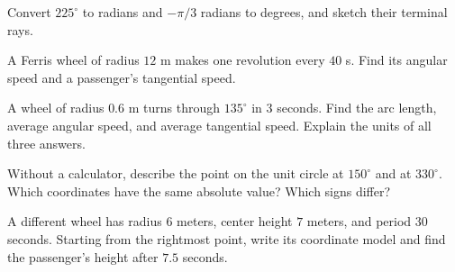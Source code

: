 \begin{practice}Convert $225^\circ$ to radians and $-\pi/3$ radians to degrees, and sketch their terminal rays.\end{practice}

\begin{practice}A Ferris wheel of radius $12$ m makes one revolution every $40$ s. Find its angular speed and a passenger's tangential speed.\end{practice}

\begin{practice}
A wheel of radius $0.6$ m turns through $135^\circ$ in $3$ seconds.
Find the arc length, average angular speed, and average tangential speed.
Explain the units of all three answers.
\end{practice}

\begin{practice}
Without a calculator, describe the point on the unit circle at
$150^\circ$ and at $330^\circ$. Which coordinates have the same
absolute value? Which signs differ?
\end{practice}

\begin{practice}
A different wheel has radius $6$ meters, center height $7$ meters,
and period $30$ seconds. Starting from the rightmost point,
write its coordinate model and find the passenger's height after
$7.5$ seconds.
\end{practice}

\clearpage
